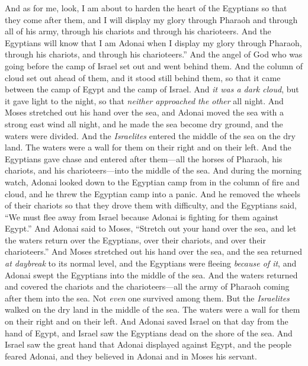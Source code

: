 \begin{biblechapter}
\verse And as for me, look, I am about to harden the heart of the Egyptians so that they come after them, and I will display my glory through Pharaoh and through all of his army, through his chariots and through his charioteers.
\verse And the Egyptians will know that I am Adonai when I display my glory through Pharaoh, through his chariots, and through his charioteers.”
\verse And the angel of God who was going before the camp of Israel set out and went behind them. And the column of cloud set out ahead of them, and it stood still behind them,
\verse so that it came between the camp of Egypt and the camp of Israel. And \textit{it was a dark cloud}, but it gave light to the night, so that \textit{neither approached the other} all night.
\verse And Moses stretched out his hand over the sea, and Adonai moved the sea with a strong east wind all night, and he made the sea become dry ground, and the waters were divided.
\verse And the \textit{Israelites} entered the middle of the sea on the dry land. The waters were a wall for them on their right and on their left.
\verse And the Egyptians gave chase and entered after them—all the horses of Pharaoh, his chariots, and his charioteers—into the middle of the sea.
\verse And during the morning watch, Adonai looked down to the Egyptian camp from in the column of fire and cloud, and he threw the Egyptian camp into a panic.
\verse And he removed the wheels of their chariots so that they drove them with difficulty, and the Egyptians said, “We must flee away from Israel because Adonai is fighting for them against Egypt.”
\verse And Adonai said to Moses, “Stretch out your hand over the sea, and let the waters return over the Egyptians, over their chariots, and over their charioteers.”
\verse And Moses stretched out his hand over the sea, and the sea returned \textit{at daybreak} to its normal level, and the Egyptians were fleeing \textit{because of it}, and Adonai swept the Egyptians into the middle of the sea.
\verse And the waters returned and covered the chariots and the charioteers—all the army of Pharaoh coming after them into the sea. Not \textit{even} one survived among them.
\verse But the \textit{Israelites} walked on the dry land in the middle of the sea. The waters were a wall for them on their right and on their left.
\verse And Adonai saved Israel on that day from the hand of Egypt, and Israel saw the Egyptians dead on the shore of the sea.
\verse And Israel saw the great hand that Adonai displayed against Egypt, and the people feared Adonai, and they believed in Adonai and in Moses his servant.
\end{biblechapter}

